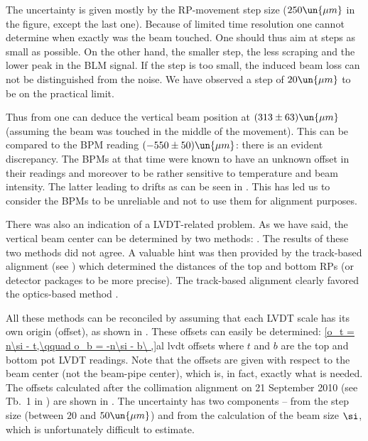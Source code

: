 The uncertainty is given mostly by the RP-movement step size ($250\un{\mu m}$ in the figure, except the last one). Because of limited time resolution one cannot determine when exactly was the beam touched. One should thus aim at steps as small as possible. On the other hand, the smaller step, the less scraping and the lower peak in the BLM signal. If the step is too small, the induced beam loss can not be distinguished from the noise. We have observed a step of $20\un{\mu m}$ to be on the practical limit.


Thus from  one can deduce the vertical beam position at $(313\pm 63)\un{\mu m}$ (assuming the beam was touched in the middle of the movement). This can be compared to the BPM reading $(-550\pm50)\un{\mu m}$: there is an evident discrepancy. The BPMs at that time were known to have an unknown offset in their readings and moreover to be rather sensitive to temperature and beam intensity. The latter leading to drifts as can be seen in . This has led us to consider the BPMs to be unreliable and not to use them for alignment purposes.


There was also an indication of a LVDT-related problem. As we have said, the vertical beam center can be determined by two methods: . The results of these two methods did not agree. A valuable hint was then provided by the track-based alignment (see ) which determined the distances of the top and bottom RPs (or detector packages to be more precise). The track-based alignment clearly favored the optics-based method .

All these methods can be reconciled by assuming that each LVDT scale has its own origin (offset), as shown in . These offsets can easily be determined:
\eqref{o_t = n\si - t,\qquad o_b = -n\si - b\ ,}{al lvdt offsets}
where $t$ and $b$ are the top and bottom pot LVDT readings. Note that the offsets are given with respect to the beam center (not the beam-pipe center), which is, in fact, exactly what is needed. The offsets calculated after the collimation alignment on 21 September 2010 (see Tb.~1 in ) are shown in . The uncertainty has two components -- from the step size (between $20$ and $50\un{\mu m}$) and from the calculation of the beam size $\si$, which is unfortunately difficult to estimate.

